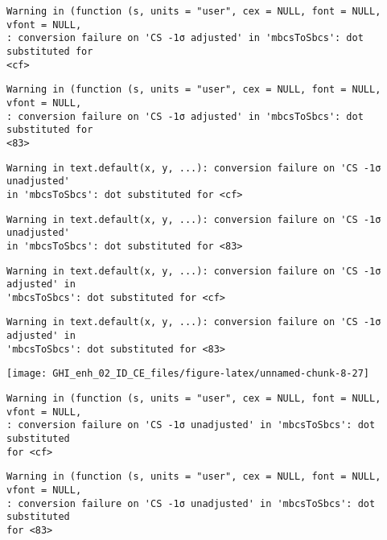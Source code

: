 \documentclass[
  10pt,
  a4paper,oneside]{article}
\begin{document}
\begin{verbatim}
Warning in (function (s, units = "user", cex = NULL, font = NULL, vfont = NULL,
: conversion failure on 'CS -1σ adjusted' in 'mbcsToSbcs': dot substituted for
<cf>
\end{verbatim}

\begin{verbatim}
Warning in (function (s, units = "user", cex = NULL, font = NULL, vfont = NULL,
: conversion failure on 'CS -1σ adjusted' in 'mbcsToSbcs': dot substituted for
<83>
\end{verbatim}

\begin{verbatim}
Warning in text.default(x, y, ...): conversion failure on 'CS -1σ unadjusted'
in 'mbcsToSbcs': dot substituted for <cf>
\end{verbatim}

\begin{verbatim}
Warning in text.default(x, y, ...): conversion failure on 'CS -1σ unadjusted'
in 'mbcsToSbcs': dot substituted for <83>
\end{verbatim}

\begin{verbatim}
Warning in text.default(x, y, ...): conversion failure on 'CS -1σ adjusted' in
'mbcsToSbcs': dot substituted for <cf>
\end{verbatim}

\begin{verbatim}
Warning in text.default(x, y, ...): conversion failure on 'CS -1σ adjusted' in
'mbcsToSbcs': dot substituted for <83>
\end{verbatim}

\begin{center}\texttt{[image: GHI\_enh\_02\_ID\_CE\_files/figure-latex/unnamed-chunk-8-27]} \end{center}

\begin{verbatim}
Warning in (function (s, units = "user", cex = NULL, font = NULL, vfont = NULL,
: conversion failure on 'CS -1σ unadjusted' in 'mbcsToSbcs': dot substituted
for <cf>
\end{verbatim}

\begin{verbatim}
Warning in (function (s, units = "user", cex = NULL, font = NULL, vfont = NULL,
: conversion failure on 'CS -1σ unadjusted' in 'mbcsToSbcs': dot substituted
for <83>
\end{verbatim}
\end{document}
